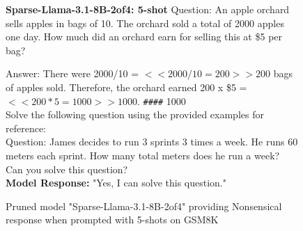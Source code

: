 \begin{figure*}
\begin{AIbox}{\bf{\large Sparse-Llama-3.1-8B-2of4: 5-shot}}
Question: An apple orchard sells apples in bags of 10. The orchard sold a total of 2000 apples one day. How much did an orchard earn for selling this at \$5 per bag?

Answer: There were 2000/10 = $<<2000/10=200>>200$ bags of apples sold.
Therefore, the orchard earned 200 x \$5 = $<<200*5=1000>>1000$.
\texttt{\#\#\#\#} 1000
\\

Solve the following question using the provided examples for reference:
\\

Question: James decides to run 3 sprints 3 times a week.  He runs 60 meters each sprint.  How many total meters does he run a week?
\\

Can you solve this question?
\\

\textbf{Model Response:} "Yes, I can solve this question."

\end{AIbox}
\caption{Pruned model "Sparse-Llama-3.1-8B-2of4" providing Nonsensical response when prompted with 5-shots on GSM8K}
\end{figure*}
